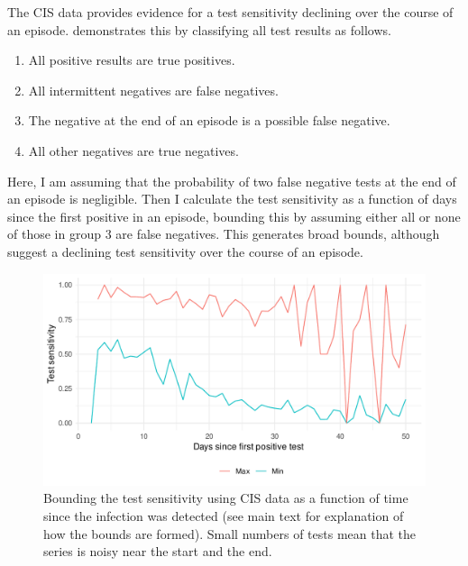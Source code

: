 \documentclass[thesis.tex]{subfiles}
\begin{document}
The CIS data provides evidence for a test sensitivity declining over the course of an episode.
 demonstrates this by classifying all test results as follows.
\begin{enumerate}
    \item All positive results are true positives.
    \item All intermittent negatives are false negatives.
    \item The negative at the end of an episode is a possible false negative.
    \item All other negatives are true negatives.
\end{enumerate}
Here, I am assuming that the probability of two false negative tests at the end of an episode is negligible.
Then I calculate the test sensitivity as a function of days since the first positive in an episode, bounding this by assuming either all or none of those in group 3 are false negatives.
This generates broad bounds, although suggest a declining test sensitivity over the course of an episode.
\begin{figure}
  \includegraphics{cis-imperfect-testing/test-sens-bound}
  \caption[Bounding test sensitivity using CIS data]{
    Bounding the test sensitivity using CIS data as a function of time since the infection was detected (see main text for explanation of how the bounds are formed).
    Small numbers of tests mean that the series is noisy near the start and the end.
  }
  \label{imperf-test:fig:bounding-cis-sensitivity}
\end{figure}
\end{document}
